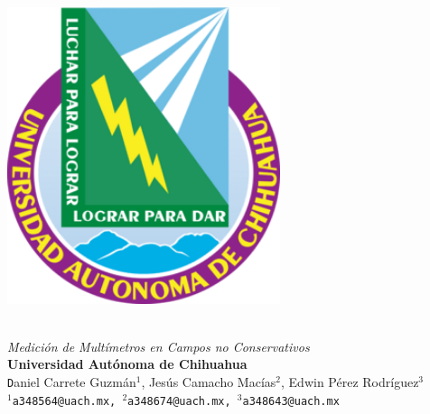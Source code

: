 \documentclass[a0,portrait]{a0poster}
\begin{document}
\renewcommand\abstractname{\Large{}}

   
\begin{minipage}[ht]{0.20\linewidth}
    \includegraphics[width=8cm]{Escudo_UACH.png}\\
\end{minipage}
\begin{minipage}[ht]{0.67\linewidth}
\veryHuge \color{NavyBlue} \textbf{} \color{Black}\\ %
\Huge\textit{\color{NavyBlue} Medición de Multímetros en Campos no Conservativos}\\[2cm] %
\huge \textbf{Universidad Autónoma de Chihuahua}\\[0.4cm] %
\Large \texttt Daniel Carrete Guzmán$^{1}$, Jesús Camacho Macías$^{2}$, Edwin Pérez Rodríguez$^{3}$\\[0.3cm] %
\texttt{$^{1}$a348564@uach.mx, $^{2}$a348674@uach.mx, $^{3}$a348643@uach.mx \\}
\end{minipage}
\end{document}

